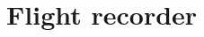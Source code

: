 \documentclass[Orbiter User Manual.tex]{subfiles}
\begin{document}
\section{Flight recorder}

\end{document}
